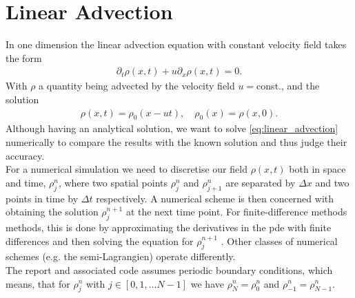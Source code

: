 \section{Linear Advection}\label{ch:linear_advection}
In one dimension the linear advection equation with constant velocity field takes the form 
\begin{align}
\partial_t\rho(x,t) +u \partial_x\rho(x,t) = 0.\label{eq:linear_advection}
\end{align}
With $\rho$ a quantity being advected by the velocity field $u=$const., and the solution
\begin{align}
\rho(x,t) = \rho_0(x-ut),\quad \rho_0(x) = \rho(x,0).\label{eq:analytical_sol}
\end{align}
Although having an analytical solution, we want to solve \cref{eq:linear_advection} numerically to compare the results with the known solution and thus judge their accuracy. \\
For a numerical simulation we need to discretise our field $\rho(x,t)$ both in space and time, $\rho_j^n$, where two spatial points $\rho_j^n$ and $\rho_{j+1}^n$ are separated by $\Delta x$ and two points in time by $\Delta t$ respectively. A numerical scheme is then concerned with obtaining the solution $\rho_j^{n+1}$ at the next time point. For finite-difference methods  methods, this is done by approximating the derivatives in the pde with finite differences and then solving the equation for $\rho_j^{n+1}$ . Other classes of numerical schemes (e.g. the semi-Lagrangien) operate differently.\\
The report and associated code assumes periodic boundary conditions, which means, that for $\rho_j^{n}$ with $j \in [0,1,... N-1] $ we have $\rho_{N}^n=\rho_0^n$ and $\rho_{-1}^n=\rho_{N-1}^n$.